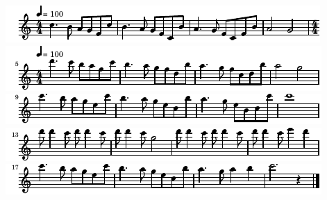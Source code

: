 \includegraphics{5e/lily-ac719e90-1}%
\ifx\betweenLilyPondSystem \undefined
  \linebreak
\else
  \expandafter{}%
\fi
\includegraphics{5e/lily-ac719e90-2}%
\ifx\betweenLilyPondSystem \undefined
  \linebreak
\else
  \expandafter{}%
\fi
\includegraphics{5e/lily-ac719e90-3}%
\ifx\betweenLilyPondSystem \undefined
  \linebreak
\else
  \expandafter{}%
\fi
\includegraphics{5e/lily-ac719e90-4}%
\ifx\betweenLilyPondSystem \undefined
  \linebreak
\else
  \expandafter{}%
\fi
\includegraphics{5e/lily-ac719e90-5}%
